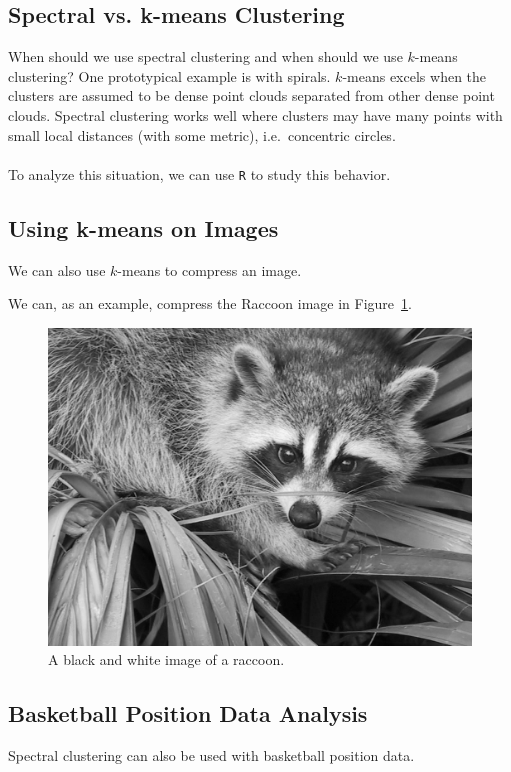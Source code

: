 \documentclass[12pt]{article}
\theoremstyle{plain}
\begin{document}
\subsection{Spectral vs. k-means Clustering}

When should we use spectral clustering and when should we use $ k $-means clustering?
One prototypical example is with spirals.
$ k $-means excels when the clusters are assumed to be dense point clouds separated from other dense point clouds.
Spectral clustering works well where clusters may have many points with small local distances (with some metric), i.e.\ concentric circles.
\\ \\
To analyze this situation, we can use \texttt{R} to study this behavior.


\subsection{Using k-means on Images}
We can also use $ k $-means to compress an image.

We can, as an example, compress the Raccoon image in Figure~\ref{fig:raccoon}.
\begin{figure}[H]
  \captionsetup{width=0.8\textwidth}
  \centering
  \includegraphics[width=\textwidth]{raccoon}
  \caption{
      A black and white image of a raccoon.
  }
  \label{fig:raccoon}
\end{figure}

\subsection{Basketball Position Data Analysis}

Spectral clustering can also be used with basketball position data.


{}

\end{document}
